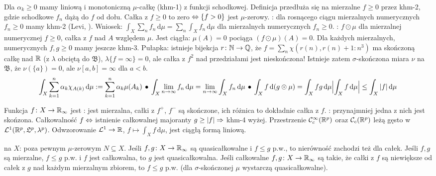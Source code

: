 Dla  $\alpha_k \ge 0$  mamy liniową i monotoniczną $\mu$-całkę (khm-1) z funkcji schodkowej.
Definicja przedłuża się na mierzalne $f \ge 0$ przez khm-2, gdzie schodkowe $f_n$ dążą do $f$ od dołu.
Całka z $f \ge 0$ to zero $\Leftrightarrow \{f > 0\}$ jest $\mu$-zerowy.
: dla rosnącego ciągu mierzalnych numerycznych $f_n \ge 0$ mamy khm-2 (Levi, ).  
Wniosek: $\int_X \sum_{n } f_n \,\textrm{d} \mu = \sum_{n} \int_X f_n\,\textrm{d}\mu$ dla mierzalnych numerycznych $f_n \ge 0$.
: $f \odot \mu$ dla mierzalnej numerycznej $f \ge 0$, całka z $f$ nad $A$ względem $\mu$.
Jest ciągła: $\mu(A) = 0$ pociąga $(f \odot \mu)(A) = 0$.
Dla każdych mierzalnych, numerycznych $f, g \ge 0$ mamy jeszcze khm-3.
Pułapka: istnieje bijekcja $r \colon \mathbb{N} \to \mathbb{Q}$, że $f = \sum_n \chi(r(n), r(n) + 1 : n^3)$ ma skończoną całkę nad $\mathbb{R}$ (z $\lambda$ obciętą do $\mathfrak B$), $\lambda \{f = \infty\} = 0$, ale całka z $f^2$ nad przedziałami jest nieskończona!
Istnieje zatem $\sigma$-skończona miara $\nu$ na $\mathfrak B$, że $\nu(\{a\}) = 0$, ale $\nu [a,b] = \infty$ dla $a < b$. %
\[
	\int_X \sum_{k=1}^n \alpha_k \chi_{A(k)} \,\textrm{d}\mu := \sum_{k=1}^n \alpha_k \mu(A_k) \spk
	\int_X \lim_{n \to \infty} f_n \,\textrm{d}\mu = \lim_{n \to \infty} \int_X f_n \,\textrm{d}\mu \spk
	\int_X f \,\textrm{d} (g \odot \mu) = \int_X fg \,\textrm{d} \mu
	\hfill  \Bigl|\int_X f \,\textrm{d}\mu \Bigr| \le \int_X |f| \,\textrm{d}\mu
\]

Funkcja  $f \colon X \to \mathbb{R}_\infty$ jest : jest mierzalna, całki z $f^+$, $f^-$ są skończone, ich różnica to dokładnie całka z $f$.
: przynajmniej jedna z nich jest skońzona.
Całkowalność $f \Leftrightarrow$ istnienie całkowalnej majoranty $g \ge |f| \Rightarrow$ khm-4 wyżej.
Przestrzenie $\mathcal C^\infty_c(\mathbb{R}^p)$ oraz $\mathcal C_c(\mathbb{R}^p)$ leżą gęsto w $\mathcal L^1(\mathbb{R}^p, \mathfrak L^p, \lambda^p)$.
Odwzorowanie $\mathcal L^1 \to \mathbb{R}$, $f \mapsto \int_X f\,\textrm{d}\mu$, jest ciągłą formą liniową.

  na $X$: poza pewnym $\mu$-zerowym $N \subseteq X$.
Jeśli $f, g \colon X \to \mathbb{R}_\infty$ są quasicałkowalne i $f \le g$ p.w., to nierówność zachodzi też dla całek.
Jeśli $f,g$ są mierzalne, $f \le g$ p.w. i $f$ jest całkowalna, to $g$ jest quasicałkowalna.
Jeśli całkowalne $f, g \colon X \to \mathbb{R}_\infty$ są takie, że całki z $f$ są niewiększe od całek z $g$ nad każdym mierzalnym zbiorem, to $f \le g$ p.w. (dla $\sigma$-skończonej $\mu$ wystarczą quasicałkowalne).

